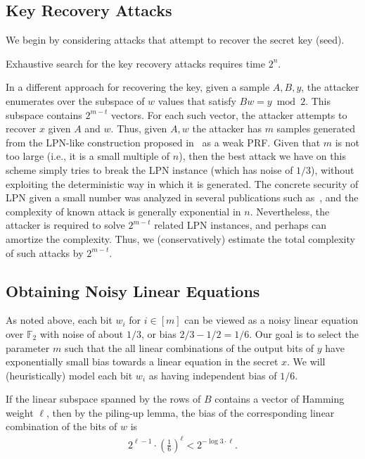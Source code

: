 \documentclass[orivec,envcountsect]{llncs}
\begin{document}
\subsection{Key Recovery Attacks}

We begin by considering attacks that attempt to recover the secret key (seed).

Exhaustive search for the key recovery attacks requires time $2^n$.

In a different approach for recovering the key, given a sample $A,B,y$,
the attacker enumerates over the subspace of $w$ values that satisfy $B w = y \bmod 2$.
This subspace contains $2^{m - t}$ vectors. For each such vector, the attacker attempts to recover $x$
given $A$ and $w$. Thus, given $A,w$ the attacker has $m$ samples
generated from the LPN-like construction proposed in~\cite{BonehIPSW18} as a weak PRF.
Given that $m$ is not too large (i.e., it is a small multiple of $n$),
then the best attack we have on this scheme simply tries to break the LPN instance (which has noise of $1/3$),
without exploiting the deterministic way in which it is generated.
The concrete security of LPN given a small number was analyzed in several publications such as~\cite{EsserKM17},
and the complexity of known attack is generally exponential in $n$.
Nevertheless, the attacker is required to solve $2^{m - t}$ related LPN instances,
and perhaps can amortize the complexity.
Thus, we (conservatively) estimate the total complexity of such attacks by $2^{m - t}$.

\subsection{Obtaining Noisy Linear Equations}


As noted above, each bit $w_i$ for $i \in [m]$ can be viewed as a noisy linear equation over $\mathbb{F}_2$
with noise of about $1/3$, or bias $2/3 - 1/2 = 1/6$.
Our goal is to select the parameter $m$ such that
the all linear combinations of the output bits of $y$
have exponentially small bias towards a linear equation in the secret $x$.
We will (heuristically) model each bit $w_i$ as having independent bias of $1/6$.

If the linear subspace spanned by the rows of $B$ contains a vector of Hamming weight $\ell$,
then by the piling-up lemma, the bias of the corresponding linear combination of the bits of $w$ is
\begin{align}\label{eq:bias_linear}
2^{\ell - 1} \cdot (\tfrac{1}{6})^{\ell} < 2^{-\log 3 \cdot \ell}.
\end{align}
\end{document}
